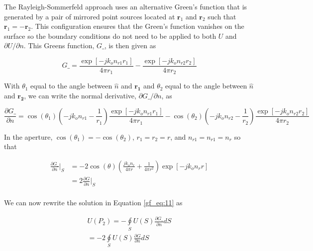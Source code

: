 The Rayleigh-Sommerfeld approach uses an alternative Green's function that is generated by a pair of mirrored point sources located at $\mathbf{r}_1$ and $\mathbf{r}_2$ such that $\mathbf{r}_1 = -\mathbf{r}_2$. This configuration ensures that the Green's function vanishes on the surface so the boundary conditions do not need to be applied to both $U$ and $\partial U/\partial n$. This Greens function, $G\_$, is then given as

\begin{equation}
G\_= \frac{\exp[-jk_on_{r1}r_1]}{4\pi r_1} - \frac{\exp[-jk_on_{r2}r_2]}{4\pi r_2}
\label{gf_eq:49}
\end{equation}
\renewcommand{\baselinestretch}{2} \small\normalsize

With $\theta_1$ equal to the angle between $\hat{n}$ and $\mathbf{r_1}$ and $\theta_2$ equal to the angle between $\hat{n}$ and $\mathbf{r_2}$, we can write the normal derivative, $\partial G\_/\partial n$, as 

\begin{equation}
\frac{\partial G\_}{\partial n}
=\cos(\theta_1)\left(-jk_on_{r1} - \frac{1}{r_1} \right)\frac{\exp[-jk_on_{r1}r_1]}{4\pi r_1} -\cos(\theta_2)\left(-jk_on_{r2} - \frac{1}{r_2} \right)\frac{\exp[-jk_on_{r2}r_2]}{4\pi r_2}
\label{gf_eq:50}
\end{equation}
\renewcommand{\baselinestretch}{2} \small\normalsize

\noindent In the aperture, $\cos(\theta_1) = -\cos(\theta_2)$, $r_1=r_2=r$, and $n_{r1} = n_{r1} = n_r$ so that

\begin{equation}
\begin{aligned}
\frac{\partial G\_}{\partial n}\bigg|_S &= -2\cos(\theta)\left(\frac{jk_on_r}{4\pi r} + \frac{1}{4\pi r^2}\right)\exp[-jk_on_rr]\\
&=2\frac{\partial G}{\partial n}\bigg|_S \\
\end{aligned}
\label{gf_eq:51}
\end{equation}
\renewcommand{\baselinestretch}{2} \small\normalsize

\noindent We can now rewrite the solution in Equation \ref{gf_eq:11} as

\begin{equation}
\begin{gathered}
U(P_2) = -\oint\limits_{S}U(S)\frac{\partial G\_}{\partial n}dS\\
= -2\oint\limits_{S}U(S)\frac{\partial G}{\partial n}dS
\end{gathered}
\label{gf_eq:52}
\end{equation}
\renewcommand{\baselinestretch}{2} \small\normalsize

